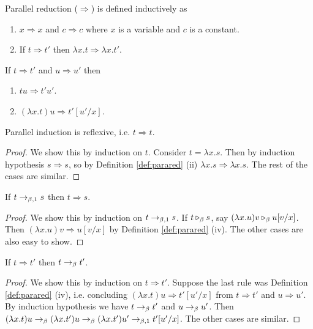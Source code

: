 \begin{boxdefi} \label{def:parared}
    \alert{Parallel reduction ($\Rightarrow$)} is defined inductively as
    \begin{enumerate}
        \item $x \Rightarrow x$ and $c \Rightarrow c$ where $x$ is a variable and $c$ is a constant.
        \item If $t \Rightarrow t'$ then $\lambda x.t \Rightarrow \lambda x. t'$.
    \end{enumerate}
    If $t \Rightarrow t'$ and $u \Rightarrow u'$ then
    \begin{enumerate}[resume]
        \item $tu \Rightarrow t'u'$.
        \item $(\lambda x.t)u \Rightarrow t'[u'/x]$.
    \end{enumerate}
\end{boxdefi}

\begin{boxlem}
    Parallel induction is reflexive, i.e. $t \Rightarrow t$.
\end{boxlem}
\begin{proof}
    We show this by induction on $t$.
    Consider $t = \lambda x.s$.
    Then by induction hypothesis $s \Rightarrow s$, so by Definition \ref{def:parared} (ii) $\lambda x.s \Rightarrow \lambda x.s$.
    The rest of the cases are similar.
\end{proof}

\begin{boxlem} \label{lem:beoredtoarrow}
    If $t \to_{\beta, 1} s$ then $t \Rightarrow s$.
\end{boxlem}
\begin{proof}
    We show this by induction on $t \to_{\beta, 1} s$.
    If $t \triangleright_{\beta} s$, say $(\lambda x.u)v \triangleright_{\beta} u [v/x]$.
    Then $(\lambda x. u)v \Rightarrow u [v/x]$ by Definition \ref{def:parared} (iv).
    The other cases are also easy to show.
\end{proof}

\begin{boxlem} \label{lem:arrowbered}
    If $t \Rightarrow t'$ then $t \to_{\beta} t'$.
\end{boxlem}
\begin{proof}
    We show this by induction on $t \Rightarrow t'$.
    Suppose the last rule was Definition \ref{def:parared} (iv), i.e. concluding $(\lambda x.t)u \Rightarrow t'[u'/x]$ from $t \Rightarrow t'$ and $u \Rightarrow u'$.
    By induction hypothesis we have $t \to_{\beta} t'$ and $u \to_{\beta} u'$.
    Then $(\lambda x.t)u \to_{\beta} (\lambda x.t') u \to_{\beta} (\lambda x. t') u' \to_{\beta, 1} t'[u'/x]$.
    The other cases are similar.
\end{proof}

